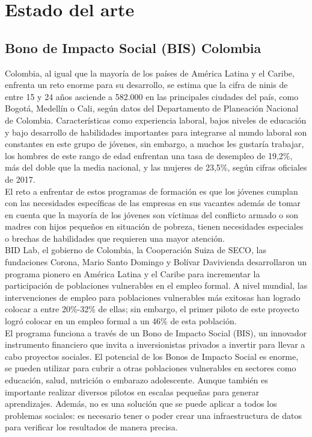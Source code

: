 \section{Estado del arte}

\subsection{Bono de Impacto Social (BIS) Colombia}

    Colombia, al igual que la mayoría de los países de América Latina y el Caribe, enfrenta un reto enorme para su desarrollo, se estima que la cifra de ninis de entre 15 y 24 años asciende a 582.000 en las principales ciudades del país, como Bogotá, Medellín o Cali, según datos del Departamento de Planeación Nacional de Colombia. Características como experiencia laboral, bajos niveles de educación y bajo desarrollo de habilidades importantes para integrarse al mundo laboral son constantes en este grupo de jóvenes, sin embargo, a muchos les gustaría trabajar, los hombres de este rango de edad enfrentan una tasa de desempleo de 19,2\%, más del doble que la media nacional, y las mujeres de 23,5\%, según cifras oficiales de 2017.\\
    
    El reto a enfrentar de estos programas de formación es que los jóvenes cumplan con las necesidades específicas de las empresas en sus vacantes además de tomar en cuenta que la mayoría de los jóvenes son víctimas del conflicto armado o son madres con hijos pequeños en situación de pobreza, tienen necesidades especiales o brechas de habilidades que requieren una mayor atención.\\

    BID Lab, el gobierno de Colombia, la Cooperación Suiza de SECO, las fundaciones Corona, Mario Santo Domingo y Bolívar Davivienda desarrollaron un programa pionero en América Latina y el Caribe para incrementar la participación de poblaciones vulnerables en el empleo formal. A nivel mundial, las intervenciones de empleo para poblaciones vulnerables más exitosas han logrado colocar a entre 20\%-32\% de ellas; sin embargo, el primer piloto de este proyecto logró colocar en un empleo formal a un 46\% de esta población.\\
    
    El programa funciona a través de un Bono de Impacto Social (BIS), un innovador instrumento financiero que invita a inversionistas privados a invertir para llevar a cabo proyectos sociales. El potencial de los Bonos de Impacto Social es enorme, se pueden utilizar para cubrir a otras poblaciones vulnerables en sectores como educación, salud, nutrición o embarazo adolescente. Aunque también es importante realizar diversos pilotos en escalas pequeñas para generar aprendizajes. Además, no es una solución que se puede aplicar a todos los problemas sociales: es necesario tener o poder crear una infraestructura de datos para verificar los resultados de manera precisa. \cite{BIS_Colombia} \\

